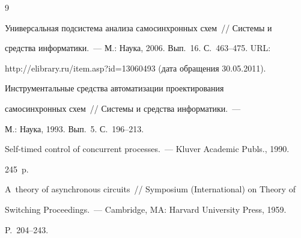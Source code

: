       {\small\frenchspacing


{%




\begin{thebibliography}{9}









Универсальная подсистема анализа самосинхронных схем~/\!\!/ Сис\-те\-мы и 


средства информатики.~--- М.: Наука, 2006.  Вып.~16. С.~463--475. URL: 


{\sf http://elibrary.ru/item.asp?id=13060493} (дата обращения 30.05.2011).









Ин\-стру\-мен\-тальные средства автоматизации проектирования 


самосинхронных схем~/\!\!/ Сис\-те\-мы и средства информатики.~--- 


М.: Наука, 1993. Вып.~5. С.~196--213.









Self-timed control of concurrent processes.~--- Kluver  Academic Publs., 1990. 


245~p.









A~theory of asynchronous circuits~/\!\!/ Symposium (International) on Theory of 


Switching Proceedings.~---  Cambridge, MA: Harvard University Press, 1959. 


P.~204--243.








\end{thebibliography}}}
